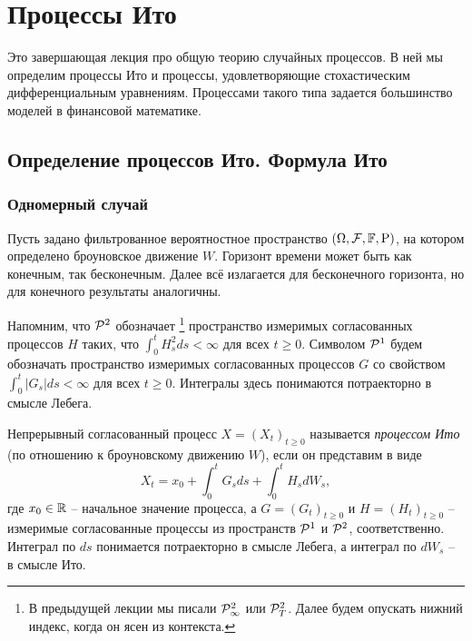 \chapter{Процессы Ито}
\label{ch:ito-processes}
\chaptertoc

Это завершающая лекция про общую теорию случайных процессов.
В ней мы определим процессы Ито и процессы, удовлетворяющие стохастическим дифференциальным уравнениям.
Процессами такого типа задается большинство моделей в финансовой математике.


\section{Определение процессов Ито. Формула Ито}

\subsection{Одномерный случай}

Пусть задано фильтрованное вероятностное пространство $(\Omega, \mathcal{F}, \mathbb{F}, \mathrm{P})$, на котором определено броуновское движение $W$.
Горизонт времени может быть как конечным, так бесконечным.
Далее всё излагается для бесконечного горизонта, но для конечного результаты аналогичны.

Напомним, что $\mathcal{P}^2$ обозначает%
\footnote{В предыдущей лекции мы писали $\mathcal{P}^2_\infty$ или $\mathcal{P}^2_T$.
Далее будем опускать нижний индекс, когда он ясен из контекста.}
пространство измеримых согласованных процессов $H$ таких, что $\int_0^t H_s^2 ds < \infty$ для всех $t\ge0$.
Символом $\mathcal{P}^1$ будем обозначать пространство измеримых согласованных процессов $G$ со свойством $\int_0^t |G_s| ds < \infty$ для всех $t\ge0$.
Интегралы здесь понимаются потраекторно в смысле Лебега. 

\begin{definition}
Непрерывный согласованный процесс $X=(X_t)_{t\ge0}$ называется \emph{процессом Ито} (по отношению к броуновскому движению $W$), если он представим в виде
\begin{equation}
\label{8:ito}  
X_t = x_0 + \int_0^t G_s ds + \int_0^t H_s d W_s,
\end{equation}
где $x_0\in \mathbb{R}$ -- начальное значение процесса, а $G=(G_t)_{t\ge0}$ и $H=(H_t)_{t\ge0}$ -- измеримые согласованные процессы из пространств $\mathcal{P}^1$ и $\mathcal{P}^2$, соответственно.
Интеграл по $ds$ понимается потраекторно в смысле Лебега, а интеграл по $dW_s$ -- в смысле Ито.
\end{definition}

